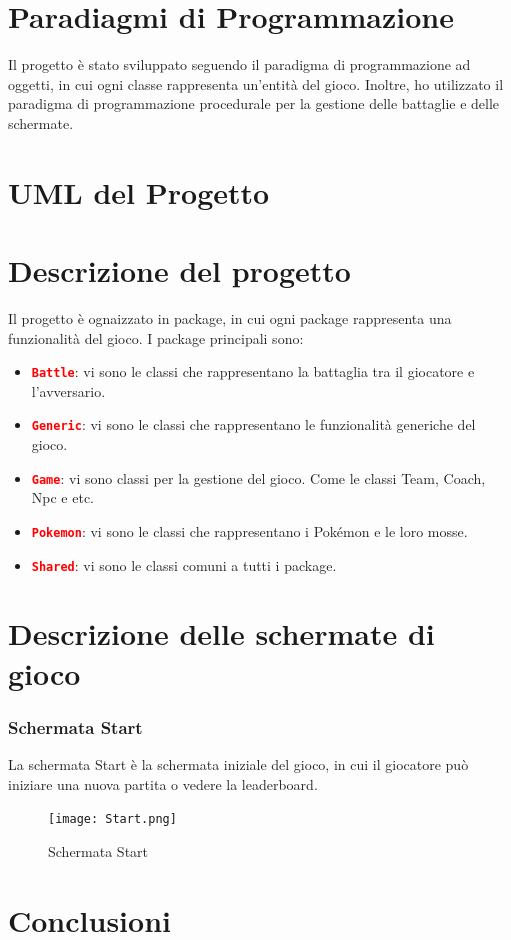 \documentclass[12pt]{article}
\begin{document}
\section{Paradiagmi di Programmazione}
Il progetto è stato sviluppato seguendo il paradigma di programmazione ad oggetti, in cui ogni classe rappresenta un'entità del gioco. Inoltre, ho utilizzato il paradigma di programmazione procedurale per la gestione delle battaglie e delle schermate.

\newpage
\section{UML del Progetto}

\section{Descrizione del progetto}
Il progetto è ognaizzato in package, in cui ogni package rappresenta una funzionalità del gioco. I package principali sono:
\begin{itemize}
    \item \textbf{\texttt{\textcolor{red}{Battle}}}: vi sono le classi che rappresentano la battaglia tra il giocatore e l'avversario.
    \item \textbf{\texttt{\textcolor{red}{Generic}}}: vi sono le classi che rappresentano le funzionalità generiche del gioco.
    \item \textbf{\texttt{\textcolor{red}{Game}}}: vi sono classi per la gestione del gioco. Come le classi Team, Coach, Npc e etc.
    \item \textbf{\texttt{\textcolor{red}{Pokemon}}}: vi sono le classi che rappresentano i Pokémon e le loro mosse.
    \item \textbf{\texttt{\textcolor{red}{Shared}}}: vi sono le classi comuni a tutti i package.
\end{itemize}
\section{Descrizione delle schermate di gioco}
\subsubsection{Schermata Start}
La schermata Start è la schermata iniziale del gioco, in cui il giocatore può iniziare una nuova partita o vedere la leaderboard.
\begin{figure}
    \centering
    \texttt{[image: Start.png]}
    \caption{Schermata Start}
\end{figure}
\section{Conclusioni}
\end{document}
